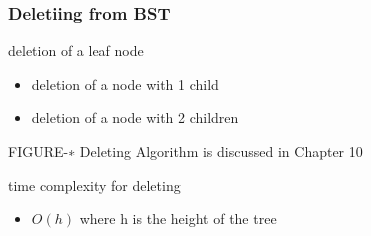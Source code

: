 \documentclass[newPxFont,sthlmFooter,nooffset]{beamer}
\begin{document}
\begin{frame}[t]
  \frametitle{Deletiing from  BST}
deletion of a leaf node
\begin{itemize}
\item deletion of a node with 1 child
\item deletion of a node with 2
  children
\end{itemize}

FIGURE-∗ Deleting Algorithm is discussed in Chapter 10

time complexity for deleting
\begin{itemize}
\item $O(h)$ where h is the height of the tree
\end{itemize}

\end{frame}
\end{document}
